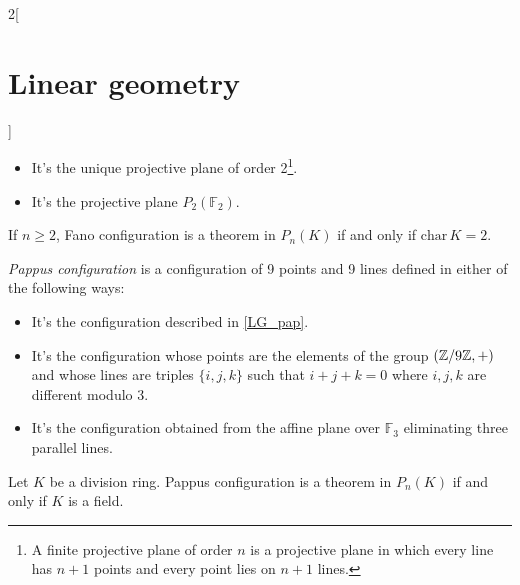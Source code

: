 \documentclass[../../../main.tex]{subfiles}
\begin{document}
\begin{multicols}{2}[\section{Linear geometry}]
\begin{definition}
\begin{itemize}
\begin{center}
            \end{center}
      \item It's the unique projective plane of order 2\footnote{A finite projective plane of order $n$ is a  projective plane in which every line has $n+1$ points and every point lies on $n+1$ lines.}.
      \item It's the projective plane $P_2(\mathbb{F}_2)$.
    \end{itemize}
  \end{definition}
  \begin{theorem}
    If $n\geq 2$, Fano configuration is a theorem in $P_n(K)$ if and only if $\text{char}\,K=2$.
  \end{theorem}
  \begin{definition}
    \textit{Pappus configuration} is a configuration of 9 points and 9 lines defined in either of the following ways:
    \begin{itemize}
      \item It's the configuration described in \cref{LG_pap}.
            \begin{center}
              \begin{minipage}{\linewidth}
                \centering
                
                \label{LG_pap}
              \end{minipage}
            \end{center}
      \item It's the configuration whose points are the elements of the group $(\mathbb{Z} /9\mathbb{Z} ,+)$ and whose lines are triples $\{i,j,k\}$ such that $i+j+k=0$ where $i,j,k$ are different modulo 3.
      \item It's the configuration obtained from the affine plane over $\mathbb{F}_3$ eliminating three parallel lines.
    \end{itemize}
  \end{definition}
  \begin{theorem}
    Let $K$ be a division ring. Pappus configuration is a theorem in $P_n(K)$ if and only if $K$ is a field.
  \end{theorem}

\end{multicols}
\end{document}

